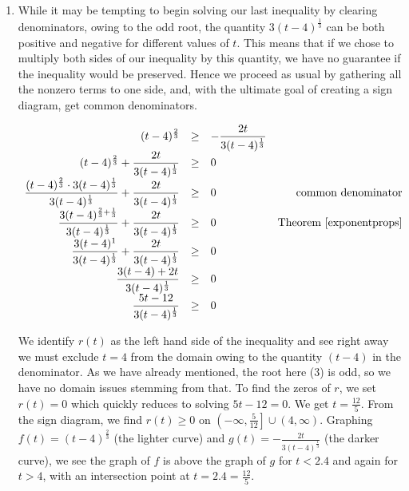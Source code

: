 \begin{ex}
\begin{enumerate}
\item While it may be tempting to begin solving  our last inequality by clearing denominators, owing to the odd root, the quantity $3(t-4)^{\frac{1}{3}}$ can be both positive and negative for different values of $t$.  This means that if we chose to multiply both sides of our inequality by this quantity, we have no guarantee if the inequality would be preserved.  Hence we proceed as usual by gathering all the nonzero terms to one side, and,  with the ultimate goal of creating a sign diagram, get common denominators.  

\[ \begin{array}{rclr}

(t-4)^{\frac{2}{3}} & \geq &  - \dfrac{2t}{3(t-4)^{\frac{1}{3}}} & \\


(t-4)^{\frac{2}{3}} + \dfrac{2t}{3(t-4)^{\frac{1}{3}}}  & \geq & 0 \\

\dfrac{ (t-4)^{\frac{2}{3}} \cdot 3(t-4)^{\frac{1}{3}} }{3(t-4)^{\frac{1}{3}}}  + \dfrac{2t}{3(t-4)^{\frac{1}{3}}} & \geq & 0 & \text{common denominator} \\

\dfrac{3(t-4)^{\frac{2}{3}+\frac{1}{3}}}{3(t-4)^{\frac{1}{3}}}  + \dfrac{2t}{3(t-4)^{\frac{1}{3}}} & \geq & 0 & \text{Theorem \ref{exponentprops}} \\ 

\dfrac{3(t-4)^{1}}{3(t-4)^{\frac{1}{3}}}  + \dfrac{2t}{3(t-4)^{\frac{1}{3}}} & \geq & 0 & \\ 

\dfrac{3(t-4) + 2t}{3(t-4)^{\frac{1}{3}}}   & \geq & 0 & \\ 

\dfrac{5t-12}{3(t-4)^{\frac{1}{3}}}   & \geq & 0 & \\ 

\end{array} \]

We identify $r(t)$ as the left hand side of the inequality and see right away we must exclude $t=4$ from the domain owing to the quantity $(t-4)$ in the denominator.  As we have already mentioned, the root here ($3$) is odd, so we have no domain issues stemming from that.  To find the zeros of $r$, we set $r(t) = 0$ which quickly reduces to solving $5t-12 = 0$.  We get $t = \frac{12}{5}$.    From the sign diagram, we find $r(t) \geq 0$ on $\left(-\infty, \frac{5}{12} \right] \cup (4, \infty)$.  Graphing $f(t) = (t-4)^{\frac{2}{3}}$ (the lighter curve) and $g(t) = -\frac{2t}{3(t-4)^{\frac{1}{3}}}$ (the darker curve), we see the graph of $f$ is above the graph of $g$ for $t < 2.4$ and again for $t > 4$, with an intersection point at $t=2.4 = \frac{12}{5}$. 


\end{enumerate}
\end{ex}
